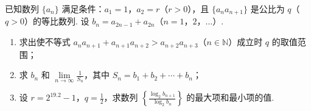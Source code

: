 \documentclass[UTF8,a4paper,oneside,11pt]{ctexbook}
\begin{document}
\begin{problem}
已知数列 \(\{a_n\}\) 满足条件：\(a_1 = 1\)，\(a_2 = r\)（\(r > 0\)），且 \(\{a_n a_{n+1}\}\) 是公比为 \(q\)（\(q > 0\)）的等比数列. 设 \(b_n = a_{2n-1} + a_{2n}\)（\(n = 1\)，\(2\)，\(\dots\)）.
\begin{enumerate}
\item 求出使不等式 \(a_n a_{n+1} + a_{n+1} a_{n+2} > a_{n+2} a_{n+3}\)（\(n \in \mathbb{N}\)）成立时 \(q\) 的取值范围；
\item 求 \(b_n\) 和 \(\lim\limits_{n \to \infty} \frac{1}{S_n}\)，其中 \(S_n = b_1 + b_2 + \cdots + b_n\)；
\item 设 \(r = 2^{19.2} - 1\)，\(q = \frac{1}{2}\)，求数列 \(\left\{\frac{\log_2 b_{n+1}}{\log_2 b_n}\right\}\) 的最大项和最小项的值.
\end{enumerate}
\end{problem}
\end{document}
